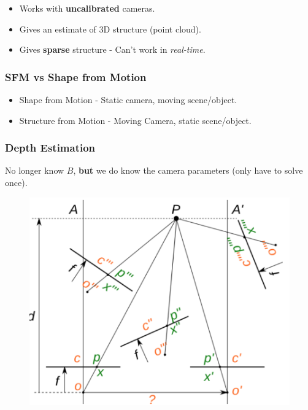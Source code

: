 \documentclass[english, 10pt]{article}
\begin{document}
\begin{itemize}
\item Works with \textbf{uncalibrated} cameras.
\item Gives an estimate of 3D structure (point cloud).
\item Gives \textbf{sparse} structure - Can't work in \textit{real-time}.
\end{itemize}

\subsubsection{SFM vs Shape from Motion}

\begin{itemize}
\item Shape from Motion - Static camera, moving scene/object.
\item Structure from Motion - Moving Camera, static scene/object.
\end{itemize}

\subsubsection{Depth Estimation}

No longer know $B$, \textbf{but} we do know the camera parameters (only have to solve once).

\begin{figure}[ht!]      
	\centering 
	\includegraphics[scale=0.3]{sfm.png}
\end{figure}
\end{document}
